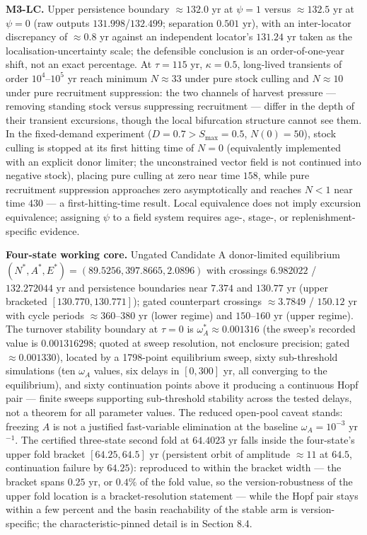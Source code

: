 \documentclass[11pt]{article}
\begin{document}
\textbf{M3-LC.} Upper persistence boundary \(\approx132.0\) yr at
\(\psi = 1\) versus \(\approx132.5\) yr at \(\psi = 0\) (raw outputs
\(131.998\)/\(132.499\); separation \(0.501\) yr), with an inter-locator
discrepancy of \(\approx0.8\) yr against an independent locator's
\(131.24\) yr taken as the localisation-uncertainty scale; the
defensible conclusion is an order-of-one-year shift, not an exact
percentage. At \(\tau = 115\) yr, \(\kappa = 0.5\), long-lived
transients of order \(10^4\)--\(10^5\) yr reach minimum \(N \approx 33\)
under pure stock culling and \(N \approx 10\) under pure recruitment
suppression: the two channels of harvest pressure --- removing standing
stock versus suppressing recruitment --- differ in the depth of their
transient excursions, though the local bifurcation structure cannot see
them. In the fixed-demand experiment (\(D = 0.7 > S_{\max} = 0.5\),
\(N(0) = 50\)), stock culling is stopped at its first hitting time of
\(N = 0\) (equivalently implemented with an explicit donor limiter; the
unconstrained vector field is not continued into negative stock),
placing pure culling at zero near time \(158\), while pure recruitment
suppression approaches zero asymptotically and reaches \(N < 1\) near
time \(430\) --- a first-hitting-time result. Local equivalence does not
imply excursion equivalence; assigning \(\psi\) to a field system
requires age-, stage-, or replenishment-specific evidence.

\textbf{Four-state working core.} Ungated Candidate A donor-limited
equilibrium \((N^*, A^*, E^*) = (89.5256, 397.8665, 2.0896)\) with
crossings \(6.982022\) / \(132.272044\) yr and persistence boundaries
near \(7.374\) and \(130.77\) yr (upper bracketed
\([130.770, 130.771]\)); gated counterpart crossings \(\approx3.7849\) /
\(150.12\) yr with cycle periods \(\approx360\)--\(380\) yr (lower
regime) and \(150\)--\(160\) yr (upper regime). The turnover stability
boundary at \(\tau = 0\) is \(\omega_A^* \approx 0.001316\) (the sweep's
recorded value is \(0.001316298\); quoted at sweep resolution, not
enclosure precision; gated \(\approx0.001330\)), located by a 1798-point
equilibrium sweep, sixty sub-threshold simulations (ten \(\omega_A\)
values, six delays in \([0, 300]\) yr, all converging to the
equilibrium), and sixty continuation points above it producing a
continuous Hopf pair --- finite sweeps supporting sub-threshold
stability across the tested delays, not a theorem for all parameter
values. The reduced open-pool caveat stands: freezing \(A\) is not a
justified fast-variable elimination at the baseline
\(\omega_A = 10^{-3}\) yr\(^{-1}\). The certified three-state second
fold at \(64.4023\) yr falls inside the four-state's upper fold bracket
\([64.25, 64.5]\) yr (persistent orbit of amplitude \(\approx11\) at
\(64.5\), continuation failure by \(64.25\)): reproduced to within the
bracket width --- the bracket spans \(0.25\) yr, or \(0.4\%\) of the
fold value, so the version-robustness of the upper fold location is a
bracket-resolution statement --- while the Hopf pair stays within a few
percent and the basin reachability of the stable arm is
version-specific; the characteristic-pinned detail is in Section 8.4.
\end{document}
